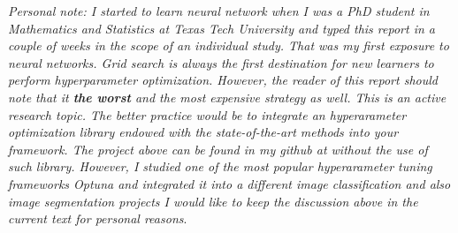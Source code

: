 \documentclass[12pt]{article}
\begin{document}
\textit{Personal note: I started to learn neural network when I was a PhD student in Mathematics and Statistics at Texas Tech University and typed this report in a couple of weeks in the scope of an individual study. That was my first exposure to neural networks. Grid search is always the first destination for new learners to perform hyperparameter optimization. However, the reader of this report should note that it \textbf{the worst} and the most expensive strategy as well. This is an active research topic. The better practice would be to integrate an hyperarameter optimization library endowed with the state-of-the-art methods into your framework. The project above can be found in my github at \cite{intel1} without the use of such library. However, I studied one of the most popular hyperarameter tuning frameworks \textit{Optuna} \cite{optuna} and integrated it into a different image classification \cite{syms} and also image segmentation projects \cite{segment}
I would like to keep the discussion above in the current text for personal reasons}.






%
%
%
%
%



\end{document}
